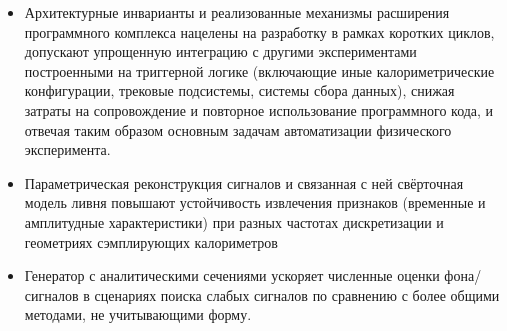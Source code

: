 \begin{itemize}
    \item Архитектурные инварианты и реализованные механизмы
    расширения программного комплекса нацелены на разработку
    в рамках коротких циклов, допускают упрощенную интеграцию с
    другими экспериментами построенными на триггерной логике (включающие
    иные калориметрические конфигурации, трековые подсистемы,
    системы сбора данных), снижая затраты на сопровождение
    и повторное использование программного кода, и отвечая таким образом
    основным задачам автоматизации физического эксперимента.
    \item Параметрическая реконструкция сигналов и связанная с ней
    свёрточная модель ливня повышают устойчивость извлечения
    признаков (временные и амплитудные характеристики)
    при разных частотах дискретизации и геометриях
    сэмплирующих калориметров
    \item Генератор с аналитическими сечениями ускоряет
    численные оценки фона/сигналов в сценариях поиска слабых
    сигналов по сравнению с более общими методами, не
    учитывающими форму.
\end{itemize}


